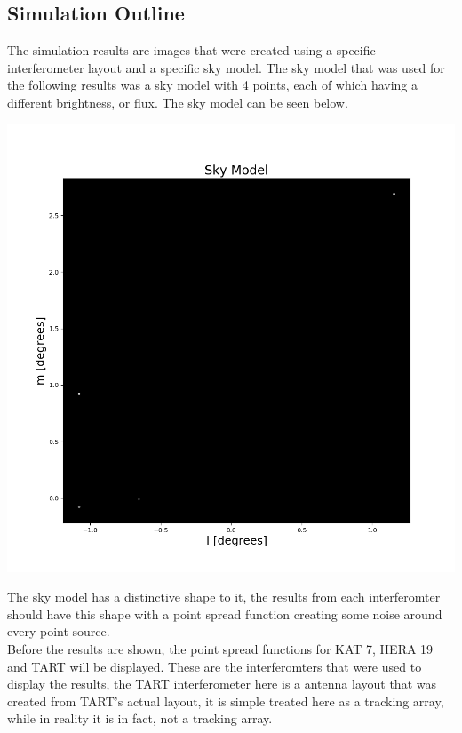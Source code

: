 \subsection{Simulation Outline}
The simulation results are images that were created using a specific interferometer layout and a specific sky model. The sky model that was used for the following results was a sky model with 4 points, each of which having a different brightness, or flux. The sky model can be seen below. 
\begin{center}
    \includegraphics[scale=0.4]{images/4_POINT.png}
\end{center}
The sky model has a distinctive shape to it, the results from each interferomter should have this shape with a point spread function creating some noise around every point source. \\
Before the results are shown, the point spread functions for KAT 7, HERA 19 and TART will be displayed. These are the interferomters that were used to display the results, the TART interferometer here is a antenna layout that was created from TART's actual layout, it is simple treated here as a tracking array, while in reality it is in fact, not a tracking array.
